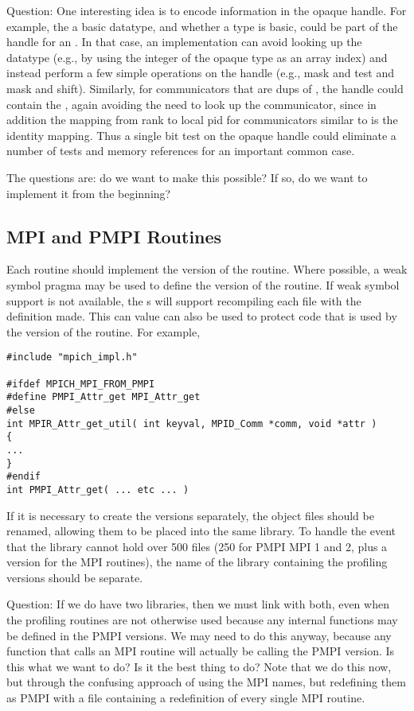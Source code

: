 \documentclass{article}
\begin{document}
Question:  One interesting idea is to encode information in the opaque
handle.  For example, the  a basic datatype, and whether
a type is basic, could be part of the handle for an
. In that case, an implementation can avoid looking
up the datatype (e.g., by using the integer of the opaque type as an
array index) and instead perform a few simple operations on the handle
(e.g., mask and test and mask and shift).  Similarly, for
communicators that are dups of , the handle could
contain the , again avoiding the need to look up the
communicator, since in addition the mapping from rank to local pid for 
communicators similar to  is the identity
mapping.  Thus a single bit test on the opaque handle could eliminate
a number of tests and memory references for an important common case.

The questions are: do we want to make this possible?  If so, do we
want to implement it from the beginning?

\subsection{MPI and PMPI Routines}
Each routine should implement the  version of the routine.
Where possible, a weak symbol pragma may be used to define the
 version of the routine.  If weak symbol support is not
available, the s will support recompiling each file
with the definition  made.  This can value
can also be used to protect code that is used by the 
version of the routine.  For example, 
\begin{verbatim}
#include "mpich_impl.h"

#ifdef MPICH_MPI_FROM_PMPI
#define PMPI_Attr_get MPI_Attr_get
#else
int MPIR_Attr_get_util( int keyval, MPID_Comm *comm, void *attr )
{
...
}
#endif
int PMPI_Attr_get( ... etc ... )
\end{verbatim}

If it is necessary to create the  versions separately, the
object files should be renamed, allowing them to be placed into the
same library.  To handle the event that the library cannot hold over
500 files (250 for PMPI MPI 1 and 2, plus a version for the MPI
routines), the name of the library containing the profiling versions
should be separate.

Question: If we do have two libraries, then we must link with both,
even when the profiling routines are not otherwise used because any
internal functions may be defined in the PMPI versions.  We may need
to do this anyway, because any function that calls an MPI routine will
actually be calling the PMPI version.  Is this what we want to do?  Is
it the best thing to do?  Note that we do this now, but through the
confusing approach of using the MPI names, but redefining them as PMPI
with a file containing a redefinition of every single MPI routine.
\end{document}
